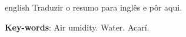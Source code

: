 \begin{resumo}[Abstract]
 \begin{otherlanguage*}{english}
   Traduzir o resumo para inglês e pôr aqui.

   \vspace{\onelineskip}
 
   \noindent 
   \textbf{Key-words}: Air umidity. Water. Acarí.
 \end{otherlanguage*}
\end{resumo}
